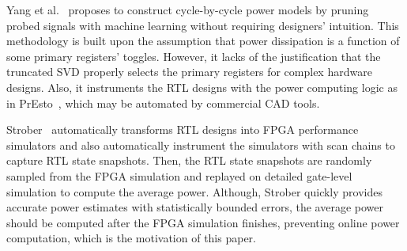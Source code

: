Yang et al.~\cite{Yang2015} proposes to construct cycle-by-cycle power models
by pruning probed signals with machine learning without requiring designers' intuition.
This methodology is built upon the assumption that power dissipation is a function of 
some primary registers' toggles. However, it lacks of the justification that the truncated SVD
properly selects the primary registers for complex hardware designs. Also, it instruments
the RTL designs with the power computing logic as in PrEsto~\cite{Sunwoo2010},
which may be automated by commercial CAD tools.

Strober~\cite{Kim2016} automatically transforms RTL designs into FPGA performance simulators
and also automatically instrument the simulators with scan chains to capture RTL state snapshots.
Then, the RTL state snapshots are randomly sampled from the FPGA simulation and replayed on
detailed gate-level simulation to compute the average power. Although, Strober quickly provides
accurate power estimates with statistically bounded errors, the average power should be computed 
after the FPGA simulation finishes, preventing online power computation, which is the motivation
of this paper.